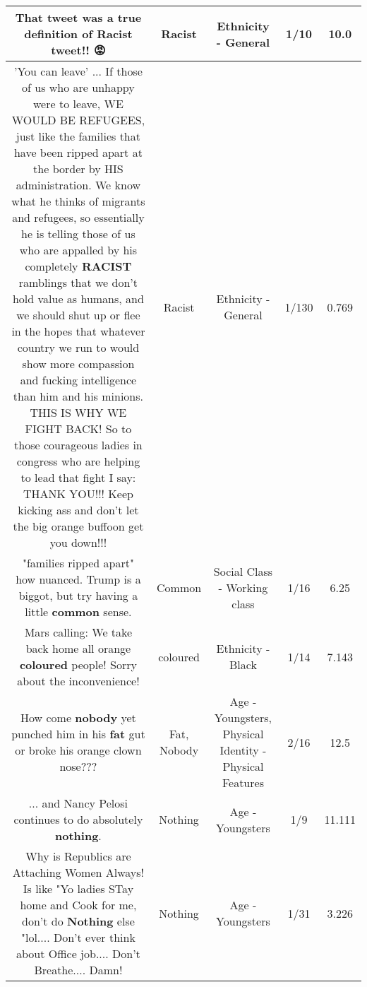 \documentclass[11pt]{article}
\newlength\mylength
\begin{document}
\begin{center}
\begin{longtable}{|C{.65\mylength}|C{.30\mylength}|C{.12\mylength}|C{.12\mylength}|C{.12\mylength}|}
  \small That tweet was a true definition of \textbf{Racist} tweet!! 😡\normalsize   & Racist & Ethnicity - General & 1/10 & 10.0 \\  \hline
  \small 'You can leave' ... If those of us who are unhappy were to leave, WE WOULD BE REFUGEES, just like the families that have been ripped apart at the border by HIS administration. We know what he thinks of migrants and refugees, so essentially he is telling those of us who are appalled by his completely \textbf{RACIST} ramblings that we don't hold value as humans, and we should shut up or flee in the hopes that whatever country we run to would show more compassion and fucking intelligence than him and his minions. THIS IS WHY WE FIGHT BACK! So to those courageous ladies in congress who are helping to lead that fight I say: THANK YOU!!! Keep kicking ass and don't let the big orange buffoon get you down!!!\normalsize   & Racist & Ethnicity - General & 1/130 & 0.769 \\  \hline
  \small "families ripped apart" how nuanced. Trump is a biggot, but try having a little \textbf{common} sense.\normalsize   & Common & Social Class - Working class & 1/16 & 6.25 \\  \hline
  \small Mars calling: We take back home all orange \textbf{coloured} people!  Sorry about the inconvenience!\normalsize   & coloured & Ethnicity - Black & 1/14 & 7.143 \\  \hline
  \small How come \textbf{nobody} yet punched him in his \textbf{fat} gut or broke his orange clown nose???\normalsize   & Fat, Nobody & Age - Youngsters, Physical Identity - Physical Features & 2/16 & 12.5 \\  \hline
  \small ... and Nancy Pelosi continues to do absolutely \textbf{nothing}.\normalsize   & Nothing & Age - Youngsters & 1/9 & 11.111 \\  \hline
  \small Why is Republics are Attaching Women Always!   Is like "Yo ladies STay home and Cook for me, don't do \textbf{Nothing} else "lol....   Don't ever think about Office job....  Don't Breathe....    Damn!\normalsize   & Nothing & Age - Youngsters & 1/31 & 3.226 \\  \hline

\end{longtable}
\end{center}
\end{document}
